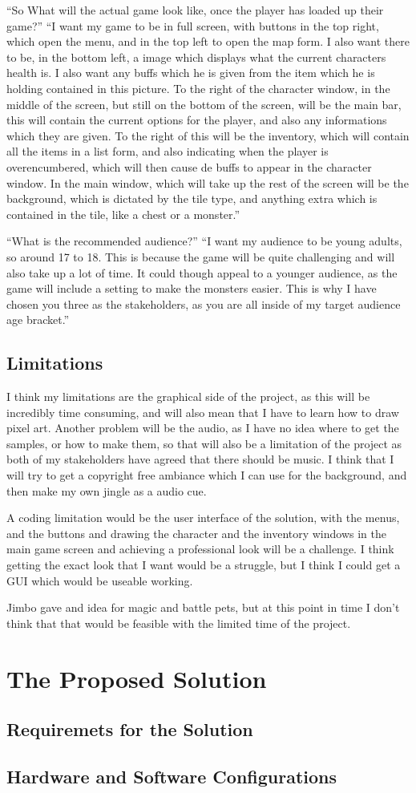 \documentclass[14pt]{article}
\begin{document}
“So What will the actual game look like, once the player has loaded up their game?”
“I want my game to be in full screen, with buttons in the top right, which open the menu, and in the top left to open the map form. I also want there to be, in the bottom left, a image which displays what the current characters health is. I also want any buffs which he is given from the item which he is holding contained in this picture. To the right of the character window, in the middle of the screen, but still on the bottom of the screen, will be the main bar, this will contain the current options for the player, and also any informations which they are given. To the right of this will be the inventory, which will contain all the items in a list form, and also indicating when the player is overencumbered, which will then cause de buffs to appear in the character window. In the main window, which will take up the rest of the screen will be the background, which is dictated by the tile type, and anything extra which is contained in the tile, like a chest or a monster.”

“What is the recommended audience?”
“I want my audience to be young adults, so around 17 to 18. This is because the game will be quite challenging and will also take up a lot of time. It could though appeal to a younger audience, as the game will include a setting to make the monsters easier. This is why I have chosen you three as the stakeholders, as you are all inside of my target audience age bracket.”

		
		\subsection{Limitations}

I think my limitations are the graphical side of the project, as this will be incredibly time consuming, and will also mean that I have to learn how to draw pixel art. Another problem will be the audio, as I have no idea where to get the samples, or how to make them, so that will also be a limitation of the project as both of my stakeholders have agreed that there should be music. I think that I will try to get a copyright free ambiance which I can use for the background, and then make my own jingle as a audio cue.

A coding limitation would be the user interface of the solution, with the menus, and the buttons and drawing the character and the inventory windows in the main game screen and achieving a professional look will be a challenge. I think getting the exact look that I want would be a struggle, but I think I could get a GUI which would be useable working.

Jimbo gave and idea for magic and battle pets, but at this point in time I don’t think that that would be feasible with the limited time of the project.

	
	\section{The Proposed Solution}

		\subsection{Requiremets for the Solution}
		
		\subsection{Hardware and Software Configurations}
	
	
\end{document}
